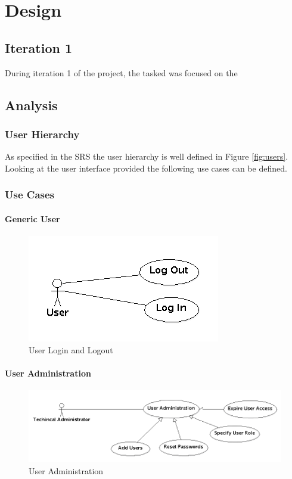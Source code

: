 \documentclass[11pt,a4paper]{report}
\begin{document}
\chapter{Design}
\section{Iteration 1}
During iteration 1 of the project, the tasked was focused on the 
\section{Analysis}

\subsection{User Hierarchy}
As specified in the SRS the user hierarchy is well defined in Figure \ref{fig:users}. Looking at the user interface provided the following use cases can be 
defined.

\subsection{Use Cases}

\subsubsection{Generic User}

\begin{figure}[htp]
\centering
\includegraphics[scale=0.5]{diagrams/use_cases/User_uc.png}
\caption{User Login and Logout}
\label{fig:UserLog}
\end{figure}



\subsubsection{User Administration}

\begin{figure}[htp]
\centering
\includegraphics[scale=0.5]{diagrams/use_cases/TechAdmin_uc.png}
\caption{User Administration}
\label{fig:UserAdmin}
\end{figure}
\end{document}
